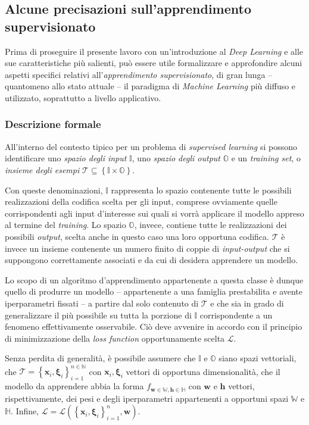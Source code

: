 \documentclass[a4paper, twoside]{article}
\begin{document}
\subsection{Alcune precisazioni sull'apprendimento supervisionato}

Prima di proseguire il presente lavoro con un'introduzione al \textit{Deep Learning} e alle sue caratteristiche più salienti, può essere utile formalizzare e approfondire alcuni aspetti specifici relativi all'\textit{apprendimento supervisionato}, di gran lunga -- quantomeno allo stato attuale -- il paradigma di \textit{Machine Learning} più diffuso e utilizzato, soprattutto a livello applicativo.

\subsubsection{Descrizione formale}

All'interno del contesto tipico per un problema di \textit{supervised learning} si possono identificare uno \textit{spazio degli input} $\mathbb{I}$, uno \textit{spazio degli output} $\mathbb{O}$ e un \textit{training set}, o \textit{insieme degli esempi} $\mathcal{T} \subseteq \left\{ \mathbb{I} \times \mathbb{O} \right\}$.

Con queste denominazioni, $\mathbb{I}$ rappresenta lo spazio contenente tutte le possibili realizzazioni della codifica scelta per gli input, comprese ovviamente quelle corrispondenti agli input d'interesse sui quali si vorrà applicare il modello appreso al termine del \textit{training}. Lo spazio $\mathbb{O}$, invece, contiene tutte le realizzazioni dei possibili \textit{output}, scelta anche in questo caso una loro opportuna codifica. $\mathcal{T}$ è invece un insieme contenente un numero finito di coppie di \textit{input-output} che si suppongono correttamente associati e da cui di desidera apprendere un modello.

Lo scopo di un algoritmo d'apprendimento appartenente a questa classe è dunque quello di produrre un modello -- appartenente a una famiglia prestabilita e avente iperparametri fissati -- a partire dal solo contenuto di $\mathcal{T}$ e che sia in grado di generalizzare il più possibile su tutta la porzione di $\mathbb{I}$ corrispondente a un fenomeno effettivamente osservabile. Ciò deve avvenire in accordo con il principio di minimizzazione della \textit{loss function} opportunamente scelta $\mathcal{L}$.

Senza perdita di generalità, è possibile assumere che $\mathbb{I}$ e $\mathbb{O}$ siano spazi vettoriali, che $\mathcal{T} = \left\{ \boldsymbol{x}_i, \boldsymbol{\xi}_i \right\}_{i=1}^{n \in \mathbb{N}}$ con $\boldsymbol{x}_i, \boldsymbol{\xi}_i$ vettori di opportuna dimensionalità, che il modello da apprendere abbia la forma $f_{\boldsymbol{w} \in \mathbb{W}, \boldsymbol{h} \in \mathbb{H}}$ con $\boldsymbol{w}$ e $\boldsymbol{h}$ vettori, rispettivamente, dei pesi e degli iperparametri appartenenti a opportuni spazi $\mathbb{W}$ e $\mathbb{H}$. Infine, $\mathcal{L} = \mathcal{L}\left(\left\{ \boldsymbol{x}_i, \boldsymbol{\xi}_i \right\}_{i=1}^{n}, \boldsymbol{w}\right)$.
\end{document}
